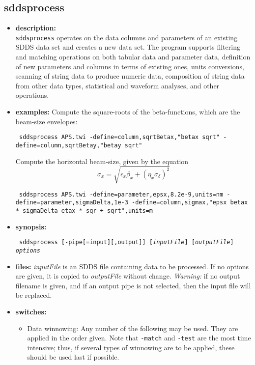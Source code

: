 \begin{latexonly}
\newpage
\end{latexonly}
\subsection{sddsprocess}
\label{sddsprocess}

\begin{itemize}
\item {\bf description:} \hspace*{1mm}\\
\verb|sddsprocess| operates on the data columns and parameters of an existing SDDS data set and creates a new
data set.  The program supports filtering and matching operations on both tabular data and parameter
data, definition of new parameters and columns in terms of existing ones, units conversions, scanning of 
string data to produce numeric data, composition of string data from other data types, 
statistical and waveform analyses, and other operations.
\item {\bf examples:}
Compute the square-roots of the beta-functions, which are the beam-size envelopes:
\begin{flushleft}{\tt
sddsprocess APS.twi -define=column,sqrtBetax,"betax sqrt"  -define=column,sqrtBetay,"betay sqrt" 
}\end{flushleft}
Compute the horizontal beam-size, given by the equation
\[ \sigma_x = \sqrt{ \epsilon_x \beta_x + (\eta_x \sigma_\delta)^2} \]
\begin{flushleft}{\tt
sddsprocess APS.twi -define=parameter,epsx,8.2e-9,units=nm -define=parameter,sigmaDelta,1e-3 
  -define=column,sigmax,"epsx betax *  sigmaDelta etax * sqr + sqrt",units=m
}\end{flushleft}
\item {\bf synopsis:} 
\begin{flushleft}{\tt
sddsprocess [-pipe[=input][,output]] [{\em inputFile}] [{\em outputFile}] {\em options}
}\end{flushleft}
\item {\bf files:}
{\em inputFile} is an SDDS file containing data to be processed.  If no options are given, it is copied to {\em
outputFile} without change.  {\em Warning:} if no output filename is given, and if an output pipe is not selected,
then the input file will be replaced.

\item {\bf switches:}
    \begin{itemize}
    \item Data winnowing: Any number of the following may be used.  They are applied in the order
given.  Note that {\tt -match} and {\tt -test} are the most time intensive; thus, if several types
of winnowing are to be applied, these should be used last if possible.


\end{itemize}
\end{itemize}
